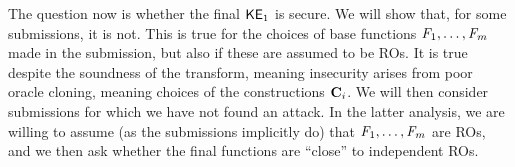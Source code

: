 The question now is whether the final ${\mathsf{KE}}_{1}$ is secure. We will show that, for some submissions, it is not. This is true for the choices of base functions $\mathit{F}_1,\ldots,\mathit{F}_m$ made in the submission, but also if these are assumed to be ROs. It is true despite the soundness of the transform, meaning insecurity arises from poor oracle cloning, meaning choices of the constructions $\mathbf{C}_i$. We will then consider submissions for which we have not found an attack. In the latter analysis, we are willing to assume (as the submissions implicitly do) that $\mathit{F}_1,\ldots,\mathit{F}_m$ are ROs, and we then ask whether the final functions are ``close'' to independent ROs.

\begin{figure}[t]
\end{figure}
